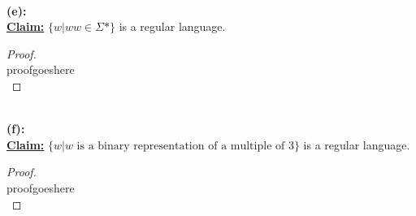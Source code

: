 \documentclass[12pt]{article}
\begin{document}
\leavevmode\\
\textbf{(e):} \\
\textbf{\underline{Claim:}} $\{ w | ww \in \Sigma* \}$ is a regular language.
\begin{proof}
\leavevmode\\
    proofgoeshere \\
\end{proof}
\leavevmode\\
\textbf{(f):} \\
\textbf{\underline{Claim:}} $\{ w | w \text{ is a binary representation of a multiple of 3} \}$ is a regular language.
\begin{proof}
\leavevmode\\
    proofgoeshere \\
\end{proof}
\leavevmode\\
\pagebreak
\end{document}
